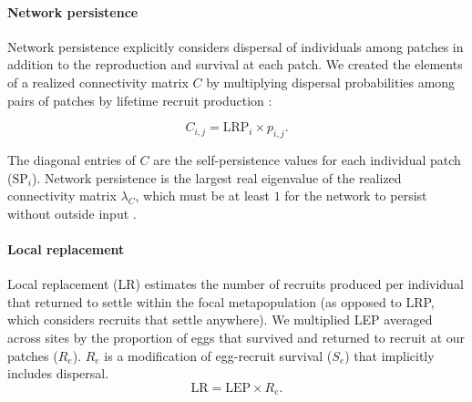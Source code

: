 \documentclass[12pt, oneside]{article}   	%
\begin{document}
\paragraph*{Network persistence}

Network persistence explicitly considers dispersal of individuals among patches in addition to the reproduction and survival at each patch. We created the elements of a realized connectivity matrix $C$ by multiplying dispersal probabilities among pairs of patches by lifetime recruit production \citep{burgess2014beyond}: 

\begin{equation}
C_{i,j} = \text{LRP}_i \times p_{i,j}. \label{EQN_Connectivity_matrix}
\end{equation} 

The diagonal entries of $C$ are the self-persistence values for each individual patch ($\text{SP}_i$). Network persistence is the largest real eigenvalue of the realized connectivity matrix $\lambda_C$, which must be at least $1$ for the network to persist without outside input \citep{hastings_persistence_2006, white_population_2010, burgess2014beyond}.

\paragraph*{Local replacement}

Local replacement (LR) estimates the number of recruits produced per individual that returned to settle within the focal metapopulation (as opposed to LRP, which considers recruits that settle anywhere). We multiplied LEP averaged across sites by the proportion of eggs that survived and returned to recruit at our patches ($R_e$). $R_e$ is a modification of egg-recruit survival ($S_e$) that implicitly includes dispersal. 
\begin{equation}
\text{LR} = \text{LEP} \times R_e. \label{EQN_LR}
\end{equation}
\end{document}
